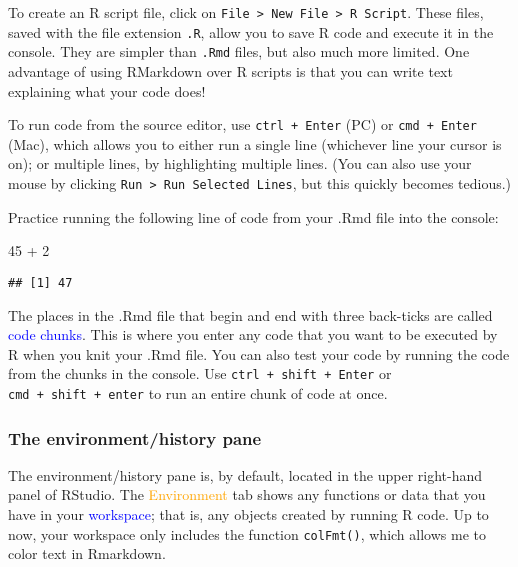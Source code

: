 \documentclass[
]{article}
\newenvironment{Shaded}{\begin{snugshade}}{\end{snugshade}}
\newcommand{\DecValTok}[1]{\textcolor[rgb]{0.00,0.00,0.81}{#1}}
\newcommand{\SpecialCharTok}[1]{\textcolor[rgb]{0.00,0.00,0.00}{#1}}
\begin{document}
To create an R script file, click on
\texttt{File\ \textgreater{}\ New\ File\ \textgreater{}\ R\ Script}.
These files, saved with the file extension \texttt{.R}, allow you to
save R code and execute it in the console. They are simpler than
\texttt{.Rmd} files, but also much more limited. One advantage of using
RMarkdown over R scripts is that you can write text explaining what your
code does!

To run code from the source editor, use \texttt{ctrl\ +\ Enter} (PC) or
\texttt{cmd\ +\ Enter} (Mac), which allows you to either run a single
line (whichever line your cursor is on); or multiple lines, by
highlighting multiple lines. (You can also use your mouse by clicking
\texttt{Run\ \textgreater{}\ Run\ Selected\ Lines}, but this quickly
becomes tedious.)

Practice running the following line of code from your .Rmd file into the
console:

\begin{Shaded}
\begin{Highlighting}[]
\DecValTok{45} \SpecialCharTok{+} \DecValTok{2}
\end{Highlighting}
\end{Shaded}

\begin{verbatim}
## [1] 47
\end{verbatim}

The places in the .Rmd file that begin and end with three back-ticks are
called \textcolor{blue}{code chunks}. This is where you enter any code
that you want to be executed by R when you knit your .Rmd file. You can
also test your code by running the code from the chunks in the console.
Use \texttt{ctrl\ +\ shift\ +\ Enter} or
\texttt{cmd\ +\ shift\ +\ enter} to run an entire chunk of code at once.

\hypertarget{the-environmenthistory-pane}{%
\subsubsection{The environment/history
pane}\label{the-environmenthistory-pane}}

The environment/history pane is, by default, located in the upper
right-hand panel of RStudio. The \textcolor{orange}{Environment} tab
shows any functions or data that you have in your
\textcolor{blue}{workspace}; that is, any objects created by running R
code. Up to now, your workspace only includes the function
\texttt{colFmt()}, which allows me to color text in Rmarkdown.
\end{document}
